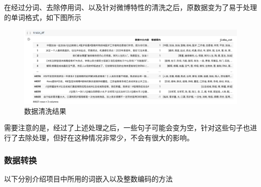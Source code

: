 \documentclass[UTF8]{ctexart}
\begin{document}
在经过分词、去除停用词、以及针对微博特性的清洗之后，原数据变为了易于处理的单词格式，如下图所示


\begin{figure}[htb]
    \centering
    \includegraphics[width=6in]{asset/数据清洗.png}
    \caption{数据清洗结果} %
\end{figure}

需要注意的是，经过了上述处理之后，一些句子可能会变为空，针对这些句子也进行了去除处理，但好在这种情况非常少，不会有很大的影响。

\subsubsection{数据转换}
以下分别介绍项目中所用的词嵌入以及整数编码的方法
\end{document}
